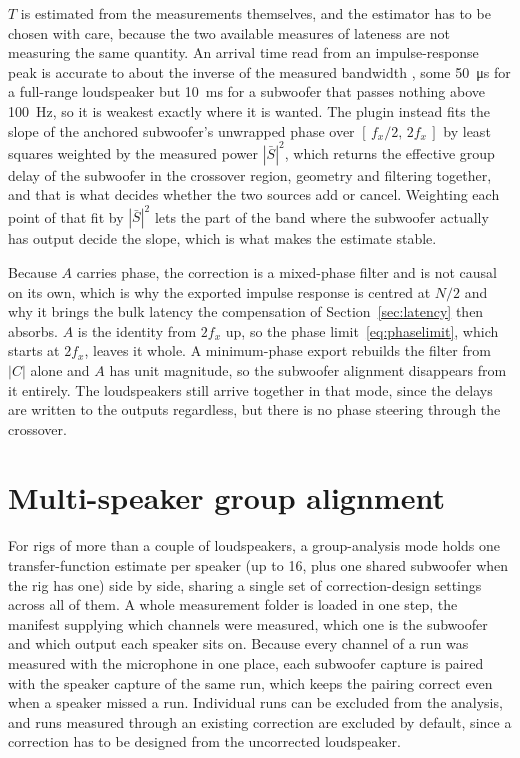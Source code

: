 \documentclass[10pt,a4paper]{article}
\begin{document}
$T$ is estimated from the measurements themselves, and the estimator has to be chosen with care, because the two available measures of lateness are not measuring the same quantity. An arrival time read from an impulse-response peak is accurate to about the inverse of the measured bandwidth \cite{Knapp1976}, some \SI{50}{\micro\second} for a full-range loudspeaker but \SI{10}{\milli\second} for a subwoofer that passes nothing above \SI{100}{\hertz}, so it is weakest exactly where it is wanted. The plugin instead fits the slope of the anchored subwoofer's unwrapped phase over $[\,f_x/2,\,2f_x\,]$ by least squares weighted by the measured power $|\bar S|^2$, which returns the effective group delay of the subwoofer in the crossover region, geometry and filtering together, and that is what decides whether the two sources add or cancel. Weighting each point of that fit by $|\bar S|^2$ lets the part of the band where the subwoofer actually has output decide the slope, which is what makes the estimate stable.

Because $A$ carries phase, the correction is a mixed-phase filter and is not causal on its own, which is why the exported impulse response is centred at $N/2$ and why it brings the bulk latency the compensation of Section~\ref{sec:latency} then absorbs. $A$ is the identity from $2f_x$ up, so the phase limit~\eqref{eq:phaselimit}, which starts at $2f_x$, leaves it whole. A minimum-phase export rebuilds the filter from $|C|$ alone and $A$ has unit magnitude, so the subwoofer alignment disappears from it entirely. The loudspeakers still arrive together in that mode, since the delays are written to the outputs regardless, but there is no phase steering through the crossover.

\section{Multi-speaker group alignment}\label{sec:group}

For rigs of more than a couple of loudspeakers, a group-analysis mode holds one transfer-function estimate per speaker (up to 16, plus one shared subwoofer when the rig has one) side by side, sharing a single set of correction-design settings across all of them. A whole measurement folder is loaded in one step, the manifest supplying which channels were measured, which one is the subwoofer and which output each speaker sits on. Because every channel of a run was measured with the microphone in one place, each subwoofer capture is paired with the speaker capture of the same run, which keeps the pairing correct even when a speaker missed a run. Individual runs can be excluded from the analysis, and runs measured through an existing correction are excluded by default, since a correction has to be designed from the uncorrected loudspeaker.
\end{document}
